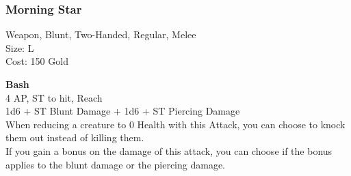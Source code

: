 \subsubsection{Morning Star}\label{weapon:morningStar}
Weapon, Blunt, Two-Handed, Regular, Melee\\
Size: L\\
Cost: 150 Gold

\textbf{Bash}\\
4 AP, ST to hit,  Reach\\
1d6 + \texttimes ST Blunt Damage + 1d6  + \texttimes ST Piercing Damage\\
When reducing a creature to 0 Health with this Attack, you can choose to knock them out instead of killing them.\\
If you gain a bonus on the damage of this attack, you can choose if the bonus applies to the blunt damage or the piercing damage.